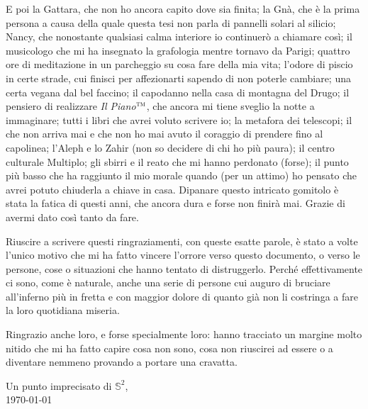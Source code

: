 E poi la Gattara, che non ho ancora capito dove sia finita; la Gnà, che è la prima persona a causa della quale questa tesi non parla di pannelli solari al silicio; Nancy, che nonostante qualsiasi calma interiore io continuerò a chiamare così; il musicologo che mi ha insegnato la grafologia mentre tornavo da Parigi; quattro ore di meditazione in un parcheggio su cosa fare della mia vita; l'odore di piscio in certe strade, cui finisci per affezionarti sapendo di non poterle cambiare; una certa vegana dal bel faccino; il capodanno nella casa di montagna del Drugo; il pensiero di realizzare \emph{Il Piano}${}^{\textsc{tm}}$, che ancora mi tiene sveglio la notte a immaginare; tutti i libri che avrei voluto scrivere io; la metafora dei telescopi; il  che non arriva mai e che non ho mai avuto il coraggio di prendere fino al capolinea; l'Aleph e lo Zahir (non so decidere di chi ho più paura); il centro culturale {\sf Multiplo}; gli sbirri e il reato che mi hanno perdonato (forse); il punto più basso che ha raggiunto il mio morale quando (per un attimo) ho pensato che avrei potuto chiuderla a chiave in casa.
Dipanare questo intricato gomitolo è stata la fatica di questi anni, che ancora dura e forse non finirà mai. Grazie di avermi dato così tanto da fare.

Riuscire a scrivere questi ringraziamenti, con queste esatte parole, è stato a volte l'unico motivo che mi ha fatto vincere l'orrore verso questo documento, o verso le persone, cose o situazioni che hanno tentato di distruggerlo. Perché effettivamente ci sono, come è naturale, anche una serie di persone cui auguro di bruciare all'inferno più in fretta e con maggior dolore di quanto già non li costringa a fare la loro quotidiana miseria. 

Ringrazio anche loro, e forse specialmente loro: hanno tracciato un margine molto nitido che mi ha fatto capire cosa non sono, cosa non riuscirei ad essere o a diventare nemmeno provando a portare una cravatta.
\vspace*{\fill}

\begin{flushright}
Un punto imprecisato di $\mathbb{S}^2$,\\
\today
\end{flushright}
